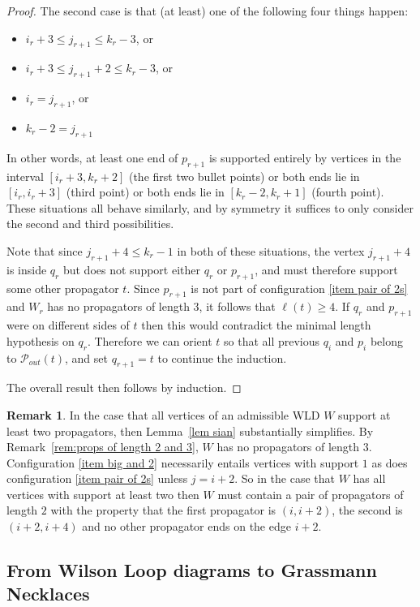 \documentclass[11pt]{article}
\newcommand{\cP}{\mathcal{P}}
\theoremstyle{remark}
\theoremstyle{definition}
\newtheorem{rmk}[thm]{Remark}
\begin{document}
\begin{proof}
The second case is that (at least) one of the following four things happen:
\begin{itemize}
\item $i_r+3 \leq j_{r+1}\leq k_r-3$, or
\item $i_r+3 \leq j_{r+1}+2\leq k_r-3$, or
\item $i_r = j_{r+1}$, or 
\item $k_r-2 = j_{r+1}$
\end{itemize}
In other words, at least one end of $p_{r+1}$ is supported entirely by vertices in the interval $[i_r+3,k_r+2]$ (the first two bullet points) or both ends lie in $[i_r, i_r+3]$ (third point) or both ends lie in $[k_r-2, k_r+1]$ (fourth point). These situations all behave similarly, and by symmetry it suffices to only consider the second and third possibilities. 

Note that since $j_{r+1}+4 \leq k_r-1$ in both of these situations, the vertex $j_{r+1}+4$ is inside $q_r$ but does not support either $q_r$ or $p_{r+1}$, and must therefore support some other propagator $t$.  Since $p_{r+1}$ is not part of configuration \ref{item pair of 2s} and $W_r$ has no propagators of length 3, it follows that $\ell(t) \geq 4$.  If $q_r$ and $p_{r+1}$ were on different sides of $t$ then this would contradict the minimal length hypothesis on $q_r$.  Therefore we can orient $t$ so that all previous $q_i$ and $p_i$ belong to $\cP_{out}(t)$, and set $q_{r+1} = t$ to continue the induction.

The overall result then follows by induction.
\end{proof}

\begin{rmk}
In the case that all vertices of an admissible WLD $W$ support at least two propagators, then Lemma~\ref{lem sian} substantially simplifies.  By Remark~\ref{rem:props of length 2 and 3}, $W$ has no propagators of length $3$.  Configuration \ref{item big and 2} necessarily entails vertices with support $1$ as does configuration \ref{item pair of 2s} unless $j=i+2$.  So in the case that $W$ has all vertices with support at least two then $W$ must contain a pair of propagators of length $2$  with the property that the first propagator is $(i, i+2)$, the second is $(i+2, i+4)$ and no other propagator ends on the edge $i+2$.
\end{rmk}


\subsection{From Wilson Loop diagrams to Grassmann Necklaces}\label{sec:GN alg}
\end{document}
